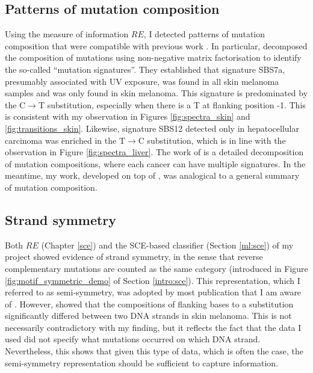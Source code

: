 \subsection{Patterns of mutation composition}
Using the measure of information $RE$, I detected patterns of mutation composition that were compatible with previous work \citep[Chapter \ref{sce};][]{Alexandrov2020}. In particular, \citet{Alexandrov2020} decomposed the composition of mutations using non-negative matrix factorisation to identify the so-called ``mutation signatures''. They established that signature SBS7a, presumably associated with UV exposure, was found in all skin melanoma samples and was only found in skin melanoma. This signature is predominated by the C$\rightarrow$T substitution, especially when there is a T at flanking position -1. This is consistent with my observation in Figures \ref{fig:spectra_skin} and \ref{fig:transitions_skin}. Likewise, signature SBS12 detected only in hepatocellular carcinoma was enriched in the T$\rightarrow$C substitution, which is in line with the observation in Figure \ref{fig:spectra_liver}. The work of \citet{Alexandrov2020} is a detailed decomposition of mutation compositions, where each cancer can have multiple signatures. In the meantime, my work, developed on top of \citet{Zhu2017}, was analogical to a general summary of mutation composition. 

\subsection{Strand symmetry}
Both $RE$ (Chapter \ref{sce}) and the SCE-based classifier (Section \ref{ml:sce}) of my project showed evidence of strand symmetry, in the sense that reverse complementary mutations are counted as the same category (introduced in Figure \ref{fig:motif_symmetric_demo} of Section \ref{intro:sce}). This representation, which I referred to as semi-symmetry, was adopted by most publication that I am aware of \citep{Alexandrov2020,Jiao2020,Zhang2020}. However, \citet{Zhu2017} showed that the compositions of flanking bases to a substitution significantly differed between two DNA strands in skin melanoma. This is not necessarily contradictory with my finding, but it reflects the fact that the data I used did not specify what mutations occurred on which DNA strand. Nevertheless, this shows that given this type of data, which is often the case, the semi-symmetry representation should be sufficient to capture information.

